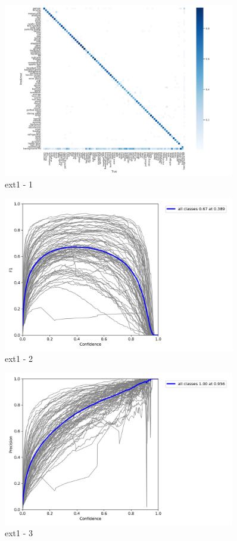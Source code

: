 \documentclass[10pt,UTF8]{ctexart}
\begin{document}
\begin{figure}[H]
\centering 
\includegraphics[width=0.90\textwidth]{ex11.png} 
\caption{ext1 - 1}
\label{Test}
\end{figure}

\begin{figure}[H]
\centering 
\includegraphics[width=0.90\textwidth]{ex12.png} 
\caption{ext1 - 2}
\label{Test}
\end{figure}

\begin{figure}[H]
\centering 
\includegraphics[width=0.90\textwidth]{ex13.png} 
\caption{ext1 - 3}
\label{Test}
\end{figure}
\end{document}
